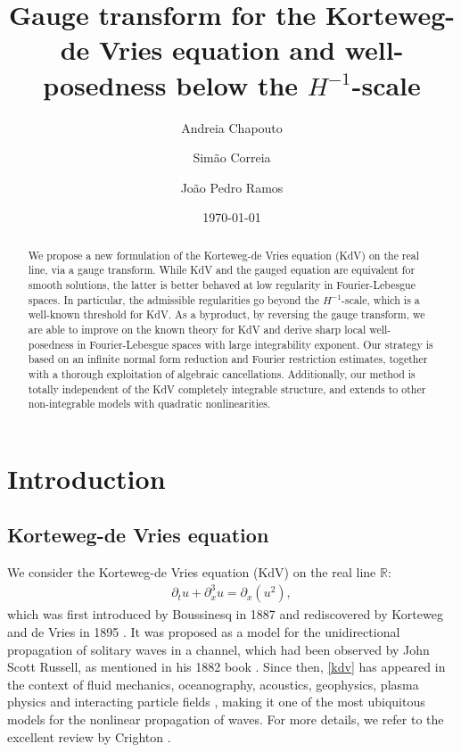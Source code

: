 \documentclass[a4paper,
11pt,  reqno]{amsart}
\title[Gauge transform for KdV and low regularity well-posedness]{Gauge transform for the Korteweg-de Vries equation and well-posedness below the $H^{-1}$-scale}
\author[A.~Chapouto \and S.~Correia \and J.~P.~Ramos]
{Andreia Chapouto \and Sim\~ao Correia \and Jo\~ao Pedro Ramos}
\date{\today}
\newcommand{\5}{\textup{V}}
\newcommand{\dx}{\partial_x}
\newcommand{\dt}{\partial_t}
\theoremstyle{remark}
\newcommand{\R}{\mathbb{R}}
\numberwithin{equation}{section}
\numberwithin{theorem}{section}
\begin{document}
\begin{abstract}


We propose a new formulation of the Korteweg-de Vries equation (KdV) on the real line, via a gauge transform.
While KdV and the gauged equation are equivalent for smooth solutions, the latter is better behaved at low regularity in Fourier-Lebesgue spaces. In particular, the admissible regularities go beyond the $H^{-1}$-scale, which is a well-known threshold for KdV. As a byproduct, by reversing the gauge transform, we are able to improve on the known theory for KdV and derive sharp local well-posedness in Fourier-Lebesgue spaces with large integrability exponent.
Our strategy is based on an infinite normal form reduction and Fourier restriction estimates, together with a thorough exploitation of algebraic cancellations. Additionally, our method is totally independent of the KdV completely integrable structure, and extends to other non-integrable models with quadratic nonlinearities.
\end{abstract}

	\maketitle

\tableofcontents



    \section{Introduction}


    \subsection{Korteweg-de Vries equation}


We consider the Korteweg-de Vries equation (KdV) on the real line $\R$:
	\begin{align}
		\label{kdv}\tag{KdV}
		\dt u + \dx^3 u = \dx(u^2),
	\end{align}
	which was first introduced by Boussinesq in 1887 \cite{Boussinesq} and rediscovered by Korteweg and de Vries in 1895 \cite{KortewegDeVries}. It was proposed as a model for the unidirectional propagation of solitary waves in a channel, which had been observed by John Scott Russell, as mentioned in his 1882 book \cite{Russell}. Since then, \eqref{kdv} has appeared in the context of fluid mechanics, oceanography, acoustics, geophysics, plasma physics and interacting particle fields \cite{Fordy, CCR_particle,  Kuznetsov_Nakoryakov_Pokusaev_Shreiber_1978,    Nezlin, OlsonChristensen, StewartCorones,WashimiTaniuti}, making it one of the most ubiquitous models for the nonlinear propagation of waves. For more details, we refer to the excellent review by Crighton \cite{Crighton}.
\end{document}
